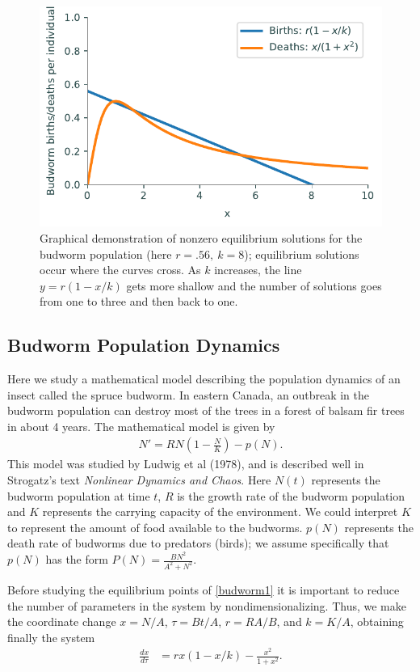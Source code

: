 \begin{figure}
\centering
\includegraphics[width=\textwidth]{figures/BudwormEquilibria.pdf}
\caption{Graphical demonstration of nonzero equilibrium solutions for the budworm population (here $r = .56,\ k=8$); equilibrium solutions occur where the curves cross.
As $k$ increases, the line $y=r(1- x/k)$ gets more shallow and the number of solutions goes from one to three and then back to one. }
\label{equilibria:budworm}
\end{figure}

\subsection*{Budworm Population Dynamics}
Here we study a mathematical model describing the population dynamics of an insect called the spruce budworm.
In eastern Canada, an outbreak in the budworm population can destroy most of the trees in a forest of balsam fir trees in about 4 years.
The mathematical model is given by
\begin{align}
N' = RN\left(1 - \frac{N}{K}\right) - p(N). \label{budworm1}
\end{align}
This model was studied by Ludwig et al (1978), and is described well in Strogatz's text \emph{Nonlinear Dynamics and Chaos}.
Here $N(t)$ represents the budworm population at time $t$, $R$ is the growth rate of the budworm population and $K$ represents the carrying capacity of the environment.
We could interpret $K$ to represent the amount of food available to the budworms.
$p(N)$ represents the death rate of budworms due to predators (birds); we assume specifically that $p(N)$ has the form $P(N) = \frac{BN^2}{A^2 + N^2}$.

Before studying the equilibrium points of \eqref{budworm1} it is important to reduce the number of parameters in the system by nondimensionalizing.
Thus, we make the coordinate change $x = N/A$, $\tau = Bt/A$, $r = RA/B$, and $k = K/A$, obtaining finally the system
\begin{align}
	\frac{dx}{d \tau} &= rx(1-x/k) - \frac{x^2}{1+x^2}.
\end{align}

